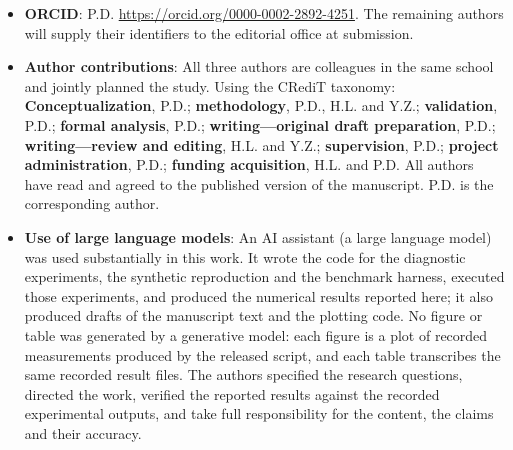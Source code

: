 \documentclass[pdflatex,iicol,sn-mathphys-num]{sn-jnl}
\begin{document}
\begin{itemize}
\item \textbf{ORCID}: P.D. \url{https://orcid.org/0000-0002-2892-4251}. The remaining authors will supply their identifiers to the editorial office at submission.

\item \textbf{Author contributions}: All three authors are colleagues in the same school and jointly planned the study. Using the CRediT taxonomy:
\textbf{Conceptualization}, P.D.; \textbf{methodology}, P.D., H.L. and Y.Z.; \textbf{validation}, P.D.; \textbf{formal analysis}, P.D.; \textbf{writing---original draft preparation}, P.D.; \textbf{writing---review and editing}, H.L. and Y.Z.; \textbf{supervision}, P.D.; \textbf{project administration}, P.D.; \textbf{funding acquisition}, H.L. and P.D. All authors have read and agreed to the published version of the manuscript. P.D. is the corresponding author.

\item \textbf{Use of large language models}: An AI assistant (a large language model) was used substantially in this work. It wrote the code for the diagnostic experiments, the synthetic reproduction and the benchmark harness, executed those experiments, and produced the numerical results reported here; it also produced drafts of the manuscript text and the plotting code. No figure or table was generated by a generative model: each figure is a plot of recorded measurements produced by the released script, and each table transcribes the same recorded result files. The authors specified the research questions, directed the work, verified the reported results against the recorded experimental outputs, and take full responsibility for the content, the claims and their accuracy.
\end{itemize}


\end{document}

